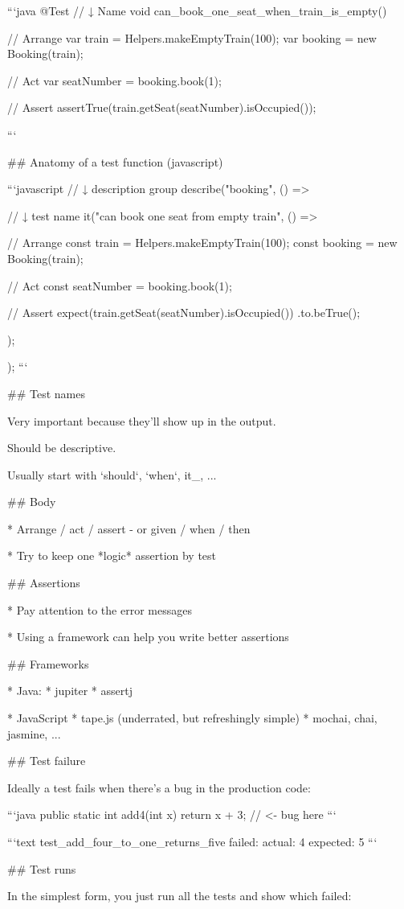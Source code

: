 ```java
@Test
// ↓ Name
void can_book_one_seat_when_train_is_empty() {
  // Arrange
  var train = Helpers.makeEmptyTrain(100);
  var booking = new Booking(train);

  // Act
  var seatNumber = booking.book(1);

  // Assert
  assertTrue(train.getSeat(seatNumber).isOccupied());
}
```

## Anatomy of a test function (javascript)

```javascript
// ↓ description group
describe("booking", () => {
     // ↓ test name
  it("can book one seat from empty train", () => {
  // Arrange
  const train = Helpers.makeEmptyTrain(100);
  const booking = new Booking(train);

  // Act
  const seatNumber = booking.book(1);

  // Assert
  expect(train.getSeat(seatNumber).isOccupied())
    .to.beTrue();

  });
});
```

## Test names

Very important because they'll show up in the output.

Should be descriptive.

Usually start with `should`, `when`,  it_, ...

## Body

* Arrange / act / assert - or  given / when / then

* Try to keep one *logic* assertion by test

## Assertions

* Pay attention to the error messages

* Using a framework can help you write better assertions

## Frameworks

* Java:
  * jupiter
  * assertj

* JavaScript
  *  tape.js (underrated, but refreshingly simple)
  *  mochai, chai, jasmine, ...

## Test failure

Ideally a test fails when there's a bug in the production code:

```java
public static int add4(int x) {
    return x + 3; // <- bug here
}
```

\vfill

```text
test_add_four_to_one_returns_five failed:
    actual: 4
  expected: 5
```

## Test runs

In the simplest form, you just run all the tests
and show which failed:

